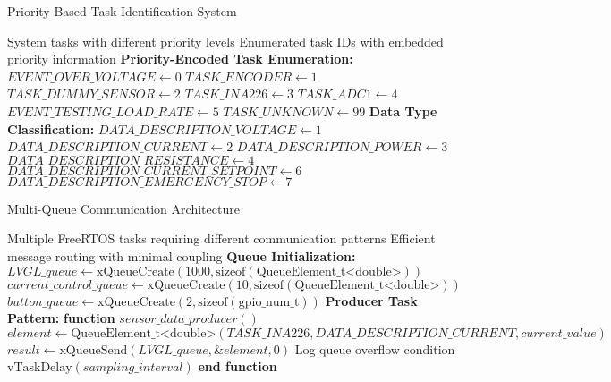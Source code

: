 \documentclass{article}
\begin{document}
\begin{algorithm}
\caption{Priority-Based Task Identification System}
\label{alg:priority_task_enum}
\begin{algorithmic}[1]
\REQUIRE System tasks with different priority levels
\ENSURE Enumerated task IDs with embedded priority information
\STATE \textbf{Priority-Encoded Task Enumeration:}
\STATE $EVENT\_OVER\_VOLTAGE \leftarrow 0$ 
\STATE $TASK\_ENCODER \leftarrow 1$ 
\STATE $TASK\_DUMMY\_SENSOR \leftarrow 2$ 
\STATE $TASK\_INA226 \leftarrow 3$ 
\STATE $TASK\_ADC1 \leftarrow 4$ 
\STATE $EVENT\_TESTING\_LOAD\_RATE \leftarrow 5$ 
\STATE $TASK\_UNKNOWN \leftarrow 99$ 
\STATE
\STATE \textbf{Data Type Classification:}
\STATE $DATA\_DESCRIPTION\_VOLTAGE \leftarrow 1$
\STATE $DATA\_DESCRIPTION\_CURRENT \leftarrow 2$
\STATE $DATA\_DESCRIPTION\_POWER \leftarrow 3$
\STATE $DATA\_DESCRIPTION\_RESISTANCE \leftarrow 4$
\STATE $DATA\_DESCRIPTION\_CURRENT\_SETPOINT \leftarrow 6$
\STATE $DATA\_DESCRIPTION\_EMERGENCY\_STOP \leftarrow 7$
\end{algorithmic}
\end{algorithm}

\begin{algorithm}
\caption{Multi-Queue Communication Architecture}
\label{alg:multi_queue_system}
\begin{algorithmic}[1]
\REQUIRE Multiple FreeRTOS tasks requiring different communication patterns
\ENSURE Efficient message routing with minimal coupling
\STATE \textbf{Queue Initialization:}
\STATE $LVGL\_queue \leftarrow \text{xQueueCreate}(1000, \text{sizeof}(\text{QueueElement\_t<double>}))$
\STATE $current\_control\_queue \leftarrow \text{xQueueCreate}(10, \text{sizeof}(\text{QueueElement\_t<double>}))$
\STATE $button\_queue \leftarrow \text{xQueueCreate}(2, \text{sizeof}(\text{gpio\_num\_t}))$
\STATE
\STATE \textbf{Producer Task Pattern:}
\STATE \textbf{function} $sensor\_data\_producer()$
    \STATE $element \leftarrow \text{QueueElement\_t<double>}(TASK\_INA226, DATA\_DESCRIPTION\_CURRENT, current\_value)$
    \STATE $result \leftarrow \text{xQueueSend}(LVGL\_queue, \&element, 0)$
        \STATE Log queue overflow condition
    \ENDIF
    \STATE $\text{vTaskDelay}(sampling\_interval)$
\ENDWHILE
\STATE \textbf{end function}
\end{algorithmic}
\end{algorithm}
\end{document}
